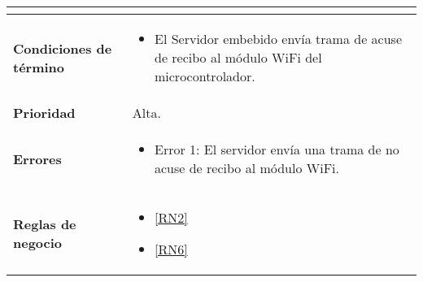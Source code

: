 \begin{longtable}{|J{5cm}|J{10.3cm}|}
\begin{itemize}
		\end{itemize} \\ \hline
	\textbf{Condiciones de término} & 
		\begin{itemize}
		    \item El Servidor embebido envía trama de acuse de recibo al módulo WiFi del microcontrolador.
		\end{itemize} 
		\\ \hline 
	\textbf{Prioridad} & 
		Alta. \\ \hline
	\textbf{Errores} &%
		 \begin{itemize}
		 	\item \label{SUB-M-CU1.4:Error1} Error 1: El servidor envía una trama de no acuse de recibo al módulo WiFi.
		 \end{itemize} \\ 
		 \hline
	\textbf{Reglas de negocio} & 
	    \begin{itemize}
	      \item  \ref{RN2}
	      \item  \ref{RN6}
		 \end{itemize}%
		 \hline
\end{longtable}

